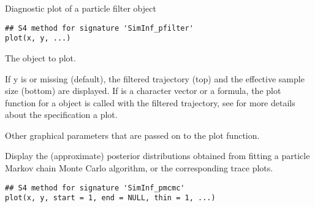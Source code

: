 \documentclass[letterpaper]{book}
\begin{document}
%
\begin{Description}
Diagnostic plot of a particle filter object
\end{Description}
%
\begin{Usage}
\begin{verbatim}
## S4 method for signature 'SimInf_pfilter'
plot(x, y, ...)
\end{verbatim}
\end{Usage}
%
\begin{Arguments}
\begin{ldescription}
\item[\code{x}] The  object to plot.

\item[\code{y}] If y is  or missing (default), the filtered
trajectory (top) and the effective sample size (bottom) are
displayed. If  is a character vector or a formula, the
plot function for a  object is called with
the filtered trajectory, see
 for more details about
the specification a plot.

\item[\code{...}] Other graphical parameters that are passed on to the
plot function.
\end{ldescription}
\end{Arguments}
%
\begin{Description}
Display the (approximate) posterior distributions obtained from
fitting a particle Markov chain Monte Carlo algorithm, or the
corresponding trace plots.
\end{Description}
%
\begin{Usage}
\begin{verbatim}
## S4 method for signature 'SimInf_pmcmc'
plot(x, y, start = 1, end = NULL, thin = 1, ...)
\end{verbatim}
\end{Usage}
%
\end{document}
